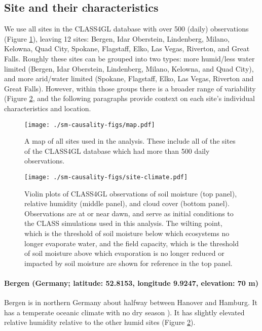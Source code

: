 \subsection{Site and their characteristics}

We use all sites in the CLASS4GL database with over 500 (daily)
observations (Figure \ref{fig:map}), leaving 12 sites: Bergen, Idar
Oberstein, Lindenberg, Milano, Kelowna, Quad City, Spokane, Flagstaff,
Elko, Las Vegas, Riverton, and Great Falls. Roughly these sites can be
grouped into two types: more humid/less water limited (Bergen, Idar
Oberstein, Lindenberg, Milano, Kelowna, and Quad City), and more
arid/water limited (Spokane, Flagstaff, Elko, Las Vegas, Riverton and
Great Falls). However, within those groups there is a broader range of
variability (Figure \ref{fig:site-climate}, and the following
paragraphs provide context on each site's individual characteristics
and location.

\begin{figure}
  \texttt{[image: ./sm-causality-figs/map.pdf]}
  \caption{A map of all sites used in the analysis. These include all
    of the sites of the CLASS4GL database \cite{wouters-class4gl-2019}
    which had more than 500 daily observations.  }
 \label{fig:map}
\end{figure}


\begin{figure}
  \texttt{[image: ./sm-causality-figs/site-climate.pdf]}
  \caption{Violin plots of CLASS4GL observations of soil moisture (top
    panel), relative humidity (middle panel), and cloud cover (bottom
    panel). Observations are at or near dawn, and serve as
    initial conditions to the CLASS simulations used in this
    analysis. The wilting point, which is the threshold of soil
    moisture below which ecosystems no longer evaporate water, and the
    field capacity, which is the threshold of soil moisture above
    which evaporation is no longer reduced or impacted by soil
    moisture are shown for reference in the top panel.}\label{fig:site-climate}
\end{figure}

\paragraph{Bergen (Germany; latitude: 52.8153, longitude 9.9247,
  elevation: 70 m)} Bergen is in northern Germany about halfway
between Hanover and Hamburg. It has a temperate oceanic climate with
no dry season \cite[K\"{o}ppen: Cfb,][]{rubel2010}). It has slightly
elevated relative humidity relative to the other humid sites (Figure
\ref{fig:site-climate}).

